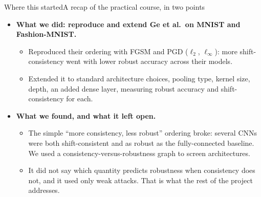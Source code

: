 \documentclass[aspectratio=169,10pt]{beamer}
\newcommand{\key}[1]{{\color{TUMdarker}\bfseries #1}}
\begin{document}
\begin{frame}{Where this started}{A recap of the practical course, in two points}
  \vspace{0.3em}
  \begin{itemize}\footnotesize\itemsep7pt
    \item \key{What we did: reproduce and extend Ge et al.\ on MNIST and Fashion-MNIST.}
      \begin{itemize}\scriptsize\itemsep2pt
        \item Reproduced their ordering with FGSM and PGD ($\ell_2$, $\ell_\infty$): more shift-consistency
          went with lower robust accuracy across their models.
        \item Extended it to standard architecture choices, pooling type, kernel size, depth, an added
          dense layer, measuring robust accuracy and shift-consistency for each.
      \end{itemize}
    \item \key{What we found, and what it left open.}
      \begin{itemize}\scriptsize\itemsep2pt
        \item The simple ``more consistency, less robust'' ordering broke: several CNNs were both
          shift-consistent and as robust as the fully-connected baseline. We used a
          consistency-versus-robustness graph to screen architectures.
        \item It did not say which quantity predicts robustness when consistency does not, and it used
          only weak attacks. That is what the rest of the project addresses.
      \end{itemize}
  \end{itemize}
\end{frame}
\end{document}
